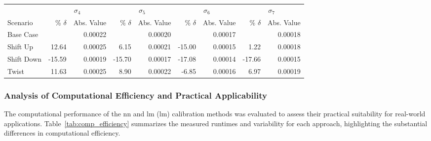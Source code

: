 \begin{table}[H]
	\centering
	\setlength{\tabcolsep}{5pt}
	\begin{threeparttable}
		\begin{tabular}{l *{4}{rr}}
			           & \multicolumn{2}{c}{$\sigma_4$} & \multicolumn{2}{c}{$\sigma_5$} & \multicolumn{2}{c}{$\sigma_6$} & \multicolumn{2}{c}{$\sigma_7$}                                                       \\
			\cmidrule(lr){2-3} \cmidrule(lr){4-5} \cmidrule(lr){6-7} \cmidrule(lr){8-9}
			Scenario   & \% $\delta$                    & Abs. Value                     & \% $\delta$                    & Abs. Value                     & \% $\delta$ & Abs. Value & \% $\delta$ & Abs. Value \\
			\midrule

			Base Case  &                                & 0.00022                        &                                & 0.00020                        &             & 0.00017    &             & 0.00018    \\
			Shift Up   & 12.64                          & 0.00025                        & 6.15                           & 0.00021                        & -15.00      & 0.00015    & 1.22        & 0.00018    \\
			Shift Down & -15.59                         & 0.00019                        & -15.70                         & 0.00017                        & -17.08      & 0.00014    & -17.66      & 0.00015    \\
			Twist      & 11.63                          & 0.00025                        & 8.90                           & 0.00022                        & -6.85       & 0.00016    & 6.97        & 0.00019    \\
			\bottomrule
		\end{tabular}
	\end{threeparttable}
\end{table}

\subsubsection{Analysis of Computational Efficiency and Practical Applicability}
The computational performance of the \ac{nn} and \ac{lm} (\ac{lm}) calibration methods was evaluated to assess their practical suitability for real-world applications. Table~\ref{tab:comp_efficiency} summarizes the measured runtimes and variability for each approach, highlighting the substantial differences in computational efficiency.

